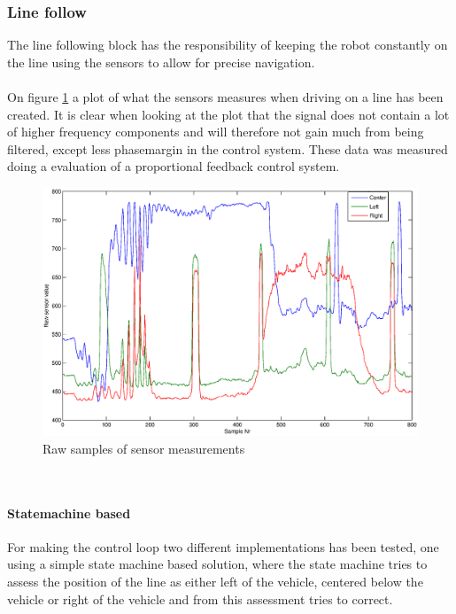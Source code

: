 \documentclass[draft, english, a4paper, 10pt]{article}
\begin{document}
		\subsubsection{Line follow} %
		    The line following block has the responsibility of keeping the robot
		    constantly on the line using the sensors to allow for precise navigation.\\
		    \\
		    On figure \ref{fig:sensor_measurements} a plot of what the sensors
		    measures when driving on a line has been created. It is clear when
		    looking at the plot that the signal does not contain a lot of higher
		    frequency components and will therefore not gain much from being filtered,
		    except less phasemargin in the control system. These data was measured
		    doing a evaluation of a proportional feedback control system.
		    \\
		    \begin{figure}[htp]
                \centering
    	        \includegraphics[scale=0.45]{sensor_measurements}
	            \caption{Raw samples of sensor measurements}\label{fig:sensor_measurements}
            \end{figure}
            \\
            \paragraph{Statemachine based}
            For making the control loop two different implementations has been
            tested, one using a simple state machine based solution, where the
            state machine tries to assess the position of the line as either left of the
            vehicle, centered below the vehicle or right of the vehicle and from
            this assessment tries to correct.\\
            \\
\end{document}
